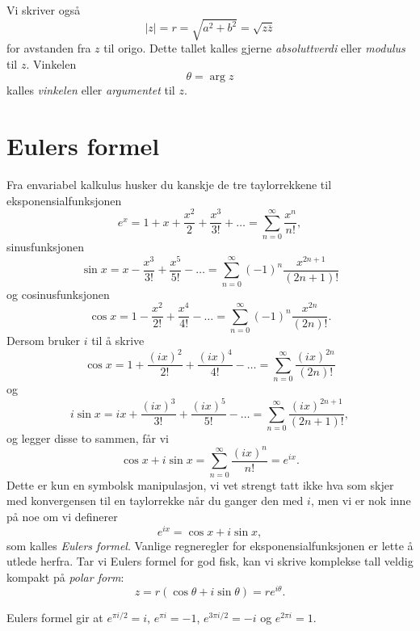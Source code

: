 Vi skriver også 
 \[|z|=r=\sqrt{a^2+b^2}=\sqrt{z\overline z}\]
 for avstanden fra $z$ til origo. 
 Dette tallet kalles gjerne \emph{absoluttverdi} eller \emph{modulus} til $z$. 
 Vinkelen 
 \[
 \theta= \arg z
 \] 
 kalles \emph{vinkelen} eller \emph{argumentet} til $z$.


\section*{Eulers formel}
Fra envariabel kalkulus husker du kanskje de tre taylorrekkene til eksponensialfunksjonen
\[
e^{x}=1+x+\frac{x^{2}}{2}+\frac{x^{3}}{3!}+\dots=\sum_{n=0}^{\infty}\frac{x^{n}}{n!}, 
\]
sinusfunksjonen
\[
\sin{x}=x-\frac{x^{3}}{3!}+\frac{x^{5}}{5!}-\dots=\sum_{n=0}^{\infty}(-1)^{n}\frac{x^{2n+1}}{(2n+1)!} 
\]
og cosinusfunksjonen
\[
\cos{x}=1-\frac{x^{2}}{2!}+\frac{x^{4}}{4!}-\dots=\sum_{n=0}^{\infty}(-1)^{n}\frac{x^{2n}}{(2n)!}.
\]
Dersom bruker $i$ til å skrive
\[
\cos{x}=1+\frac{(ix)^{2}}{2!}+\frac{(ix)^{4}}{4!}-\dots=\sum_{n=0}^{\infty}\frac{(ix)^{2n}}{(2n)!}
\]
og 
\[
i\sin{x}=ix+\frac{(ix)^{3}}{3!}+\frac{(ix)^{5}}{5!}-\dots=\sum_{n=0}^{\infty}\frac{(ix)^{2n+1}}{(2n+1)!},
\]
og legger disse to sammen, får vi 
\[
\cos x + i\sin x=\sum_{n=0}^{\infty}\frac{(ix)^{n}}{n!}=e^{ix}.
\]
Dette er kun en symbolsk manipulasjon, 
vi vet strengt tatt ikke hva som skjer med konvergensen til en taylorrekke når du ganger den med $i$, 
men vi er nok inne på noe om vi definerer
\[
e^{ix}=\cos x + i\sin x,
\]
som kalles \emph{Eulers formel}. 
Vanlige regneregler for eksponensialfunksjonen er lette å utlede herfra.
Tar vi Eulers formel for god fisk, kan vi skrive komplekse tall veldig kompakt på \emph{polar form}:
\[
z=r(\cos \theta+i\sin \theta)=re^{i\theta}.
\]

\begin{ex}
Eulers formel gir at $e^{ \pi i/2 }=i$, $e^{\pi i}=-1$, $e^{3\pi i/2 }=-i$ og $e^{2 \pi i}=1$.
\end{ex}

